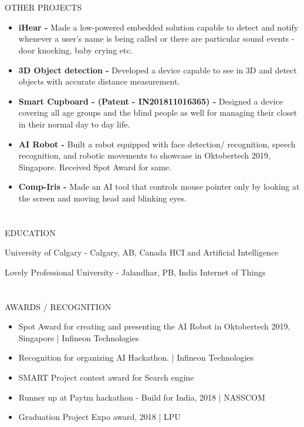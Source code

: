 \documentclass{my_cv}
\begin{document}
\begin{multicols}{2}
\section{\faPaintBrush}{OTHER PROJECTS}
\begin{itemize}[noitemsep]
    \item \textbf{iHear - } Made a low-powered embedded solution capable to detect and notify whenever a user's name is being called or there are particular sound events - door knocking, baby crying etc.
    \item \textbf{3D Object detection -} Developed a device capable to see in 3D and detect objects with accurate distance measurement.
    \item \textbf{Smart Cupboard - (Patent - IN201811016365) -} Designed a device covering all age groups and the blind people as well for managing their closet in their normal day to day life.
    \item \textbf{AI Robot - }Built a robot equipped with face detection/ recognition, speech recognition, and robotic movements to showcase in Oktobertech 2019, Singapore. Received Spot Award for same.
    
    \item \textbf{Comp-Iris - } Made an AI tool that controls mouse pointer only by looking at the screen and moving head and blinking eyes.
    
\end{itemize}

\section{\faGraduationCap}{EDUCATION}
    
{University of Calgary - Calgary, AB, Canada} %
{HCI and Artificial Intelligence }
    
%
{Lovely Professional University - Jalandhar, PB, India} %
{Internet of Things}

\section{\faStar}{AWARDS / RECOGNITION}

\begin{itemize}[noitemsep]
    \item Spot Award for creating and presenting the AI Robot in Oktobertech 2019, Singapore | Infineon Technologies
    \item Recognition for organizing AI Hackathon. | Infineon Technologies
    \item SMART Project contest award for Search engine
    \item Runner up at Paytm hackathon - Build for India,  2018 | NASSCOM
    \item Graduation Project Expo award, 2018 | LPU 
\end{itemize}


\end{multicols}
\end{document}
